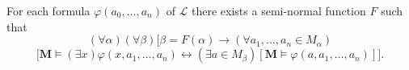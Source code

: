 For each formula $\varphi(a_0, \ldots, a_n)$ of $\mathcal{L}$ there exists a semi-normal function $F$ such that
$$(\forall \alpha)(\forall \beta)\bigl[\beta = F(\alpha) \to (\forall a_1, \ldots, a_n \in M_\alpha)$$
$$[\mathbf{M} \models (\exists x) \varphi(x, a_1, \ldots, a_n) \leftrightarrow (\exists a \in M_\beta)[\mathbf{M} \models \varphi(a, a_1, \ldots, a_n)]\bigr].$$
